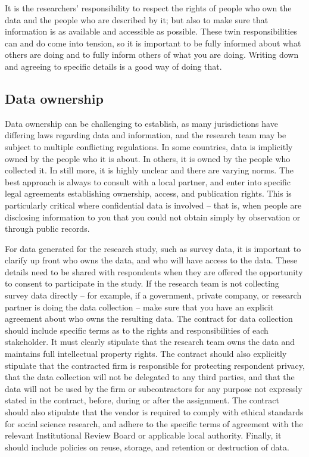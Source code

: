 It is the researchers' responsibility to respect the rights
of people who own the data and the people who are described by it;
but also to make sure that information is as available and accessible as possible.
These twin responsibilities can and do come into tension,
so it is important to be fully informed about what others are doing
and to fully inform others of what you are doing.
Writing down and agreeing to specific details is a good way of doing that.

\subsection{Data ownership}
Data ownership can be challenging to establish,
as many jurisdictions have differing laws regarding data and information,
and the research team may be subject to multiple conflicting regulations.
In some countries, data is implicitly owned by the people who it is about.
In others, it is owned by the people who collected it.
In still more, it is highly unclear and there are varying norms.
The best approach is always to consult with a local partner, 
and enter into specific legal agreements establishing ownership, 
access, and publication rights.
This is particularly critical where confidential data is involved
-- that is, when people are disclosing information to you
that you could not obtain simply by observation or through public records. 

For data generated for the research study, such as survey data, 
it is important to clarify up front who owns the data,
and who will have access to the data.
These details need to be shared with respondents when they are offered the opportunity 
to consent to participate in the study. 
If the research team is not collecting survey data directly --
for example, if a government, private company, or research partner is doing the data collection --
make sure that you have an explicit agreement
about who owns the resulting data. 
The contract for data collection should include specific terms 
as to the rights and responsibilities of each stakeholder.
It must clearly stipulate that the research team owns the data
and maintains full intellectual property rights. 
The contract should also explicitly stipulate that the contracted firm
is responsible for protecting respondent privacy, 
that the data collection will not be delegated to any third parties,
and that the data will not be used by the firm or subcontractors for any purpose not expressly stated in the contract,
before, during or after the assignment. 
The contract should also stipulate that the vendor is required to comply with 
ethical standards for social science research, 
and adhere to the specific terms of agreement with the relevant 
Institutional Review Board or applicable local authority.
Finally, it should include policies on reuse, storage, and retention or destruction of data. 

